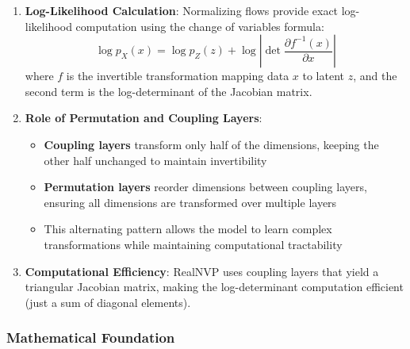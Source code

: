 \documentclass[conference,12pt]{IEEEtran}
\begin{document}
\begin{enumerate}
\begin{enumerate}
        \item \textbf{Expressiveness}: By stacking multiple coupling layers with alternating masks, all dimensions get transformed over multiple layers, enabling complex transformations
        
        \item \textbf{Efficiency}: The Jacobian determinant is simply:
        \begin{equation}
            \det \frac{\partial y}{\partial x} = \prod_{i=d+1}^{D} \exp(s_i(x_{1:d})) = \exp\left(\sum_{i=d+1}^{D} s_i(x_{1:d})\right)
        \end{equation}
        This is computationally efficient (just a sum) compared to computing full determinant ($O(D^3)$).
    \end{enumerate}
    
    \item \textbf{Log-Likelihood Calculation}: Normalizing flows provide exact log-likelihood computation using the change of variables formula:
    \begin{equation}
        \log p_X(x) = \log p_Z(z) + \log \left|\det \frac{\partial f^{-1}(x)}{\partial x}\right|
    \end{equation}
    where $f$ is the invertible transformation mapping data $x$ to latent $z$, and the second term is the log-determinant of the Jacobian matrix.
    
    \item \textbf{Role of Permutation and Coupling Layers}: 
    \begin{itemize}
        \item \textbf{Coupling layers} transform only half of the dimensions, keeping the other half unchanged to maintain invertibility
        \item \textbf{Permutation layers} reorder dimensions between coupling layers, ensuring all dimensions are transformed over multiple layers
        \item This alternating pattern allows the model to learn complex transformations while maintaining computational tractability
    \end{itemize}
    
    \item \textbf{Computational Efficiency}: RealNVP uses coupling layers that yield a triangular Jacobian matrix, making the log-determinant computation efficient (just a sum of diagonal elements).
\end{enumerate}

\subsubsection{Mathematical Foundation}
\end{document}
